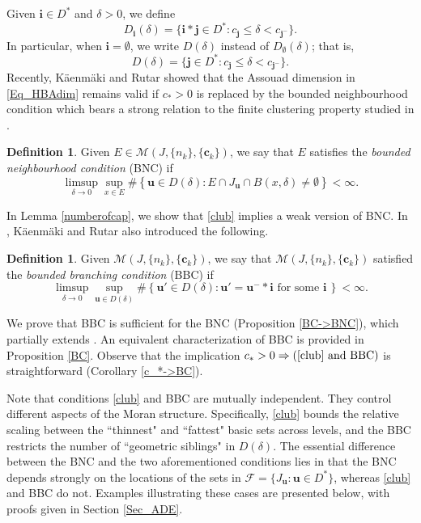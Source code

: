 \documentclass[12pt]{amsart}
\numberwithin{equation}{section}
\theoremstyle{plain}
\theoremstyle{remark}
\theoremstyle{definition}
\newtheorem{definition}[theorem]{Definition}
\newcommand{\iii}{\mathbf{i}}
\newcommand{\jjj}{\mathbf{j}}
\newcommand{\bu}{\mathbf{u}}
\newcommand{\ccc}{\mathbf{c}}
\newcommand{\de}{\delta}
\renewcommand{\le}{\leqslant}
\begin{document}
	Given $\iii\in D^*$ and $\de>0$, we define
	\[
	D_{\iii}(\de)=\{\iii*\jjj\in D^*: c_{\jjj}\le \de < c_{\jjj^-}\}.
	\]
	In particular, when $\iii=\emptyset$, we write $D(\de)$ instead of $D_{\emptyset}(\de)$; that is,
	\[
	D(\de)=\{\jjj\in D^*: c_{\jjj}\le \de < c_{\jjj^-}\}.
	\]
	Recently,  K{\"a}enm{\"a}ki and Rutar \cite{kaenmaki2024regularity}  showed that the Assouad dimension in \eqref{Eq_HBAdim}  remains valid if $c_*>0$ is replaced by the bounded neighbourhood condition which  bears a strong relation to the finite clustering property studied in \cite{kaenmaki2015weak,MR2415480,rajala2011weakly}. 
	\begin{definition} 
		Given  $E\in \mathcal{M}(J,\{n_k\},\{\ccc_k\})$, we say that $E$ satisfies the \textit{bounded neighbourhood condition} (BNC) if
		\[
		\limsup_{\de\to 0}\sup_{x\in E}\# \left\{\bu\in D(\de):E\cap J_{\bu}\cap B(x,\de)\neq \emptyset \right\}<\infty.
		\]
	\end{definition}
In Lemma \ref{numberofcap}, we show that \eqref{club} implies a weak version of BNC.  
In  \cite{kaenmaki2024regularity}, 	K{\"a}enm{\"a}ki and Rutar also introduced the following.
	\begin{definition}
		Given  $\mathcal{M}(J,\{n_k\},\{\ccc_k\})$, we say that $\mathcal{M}(J,\{n_k\},\{\ccc_k\})$ satisfied the  {\em bounded branching condition} (BBC) if
		\begin{equation*}
			\limsup_{\de\to 0}\sup_{\bu\in D(\de)}\# \left\{\bu'\in D(\de):\bu'=\bu^-*\iii\text {\ for some }\iii\, \right\}<\infty.
		\end{equation*}
	\end{definition}

We prove that BBC is sufficient for the BNC (Proposition \ref{BC->BNC}), which partially extends \cite[Theorem B]{kaenmaki2024regularity}. An equivalent characterization of BBC is provided in Proposition \ref{BC}. Observe that the implication $c_*>0 \Rightarrow (\text{\eqref{club}} \text{ and } \text{BBC})$ is straightforward (Corollary  \ref{c_*->BC}).
	
	


 Note that conditions \eqref{club} and  BBC  are mutually independent. They control different aspects of the Moran structure. Specifically, \eqref{club} bounds the relative scaling between the ``thinnest" and ``fattest" basic sets across levels, and the BBC \cite{kaenmaki2024regularity} restricts the number of ``geometric siblings" in $D(\delta)$.  The essential difference between the BNC and the two aforementioned conditions lies in that the BNC  depends strongly on the locations of the sets in $\mathcal{F}=\{J_{\bu}:\bu\in D^*\}$, whereas  \eqref{club} and  BBC do not.
Examples illustrating these cases are presented below, with proofs given in Section \ref{Sec_ADE}.
	
\end{document}
